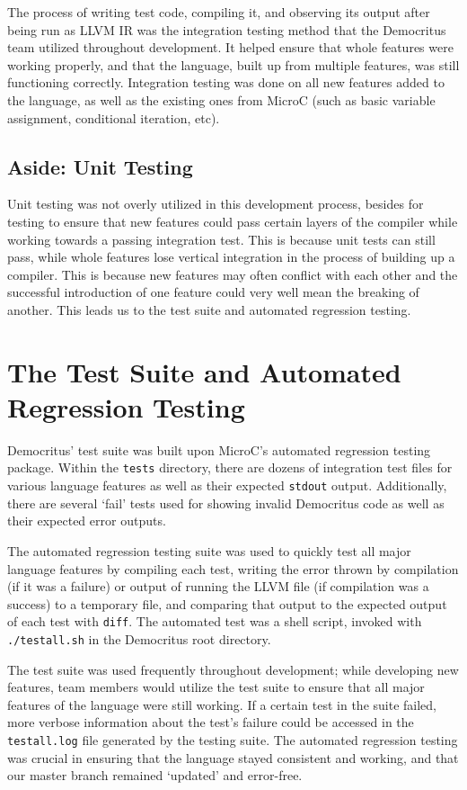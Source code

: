     \medskip \noindent
    The process of writing test code, compiling it, and observing its output after being run as LLVM IR was the integration testing method that the Democritus team utilized throughout development. It helped ensure that whole features were working properly, and that the language, built up from multiple features, was still functioning correctly. Integration testing was done on all new features added to the language, as well as the existing ones from MicroC (such as basic variable assignment, conditional iteration, etc).  

	\subsection{Aside: Unit Testing}
    Unit testing was not overly utilized in this development process, besides for testing to ensure that new features could pass certain layers of the compiler while working towards a passing integration test. This is because unit tests can still pass, while whole features lose vertical integration in the process of building up a compiler. This is because new features may often conflict with each other and the successful introduction of one feature could very well mean the breaking of another. This leads us to the test suite and automated regression testing.

\section{The Test Suite and Automated Regression Testing}
  Democritus' test suite was built upon MicroC's automated regression testing package. Within the \texttt{tests} directory, there are dozens of integration test files for various language features as well as their expected \texttt{stdout} output. Additionally, there are several `fail' tests used for showing invalid Democritus code as well as their expected error outputs. 

  \medskip \noindent
  The automated regression testing suite was used to quickly test all major language features by compiling each test, writing the error thrown by compilation (if it was a failure) or output of running the LLVM file (if compilation was a success) to a temporary file, and comparing that output to the expected output of each test with \texttt{diff}. The automated test was a shell script, invoked with \verb|./testall.sh| in the Democritus root directory.

  \medskip \noindent
  The test suite was used frequently throughout development; while developing new features, team members would utilize the test suite to ensure that all major features of the language were still working. If a certain test in the suite failed, more verbose information about the test's failure could be accessed in the \texttt{testall.log} file generated by the testing suite. The automated regression testing was crucial in ensuring that the language stayed consistent and working, and that our master branch remained `updated' and error-free.


